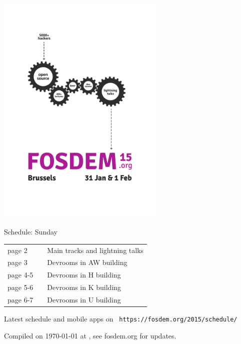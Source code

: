 \documentclass[a4paper,10pt]{article}
\begin{document}
\label{cover}
\begin{center}
\includegraphics[width=0.6\textwidth]{artwork/flyer_nobg}


{\fontsize{35}{45}\selectfont
\bf

Schedule: Sunday
}

\vfill

{\Large
\begin{tabular}{lll}
page 2   & &  Main tracks and lightning talks \\
page 3   & &  Devrooms in AW building \\
page 4-5 & &  Devrooms in H building \\
page 5-6 & &  Devrooms in K building \\
page 6-7 & &  Devrooms in U building \\
\end{tabular}

\vfill

Latest schedule and mobile apps on ~\texttt{https://fosdem.org/2015/schedule/}
}

\vfill

\end{center}

Compiled on {\ddmmyyyydate\today} at \currenttime, see fosdem.org for updates.


{%
\fontsize{10.5}{8.2}\selectfont%
\renewcommand{\arraystretch}{0.9}%
%
%
}
\end{document}
